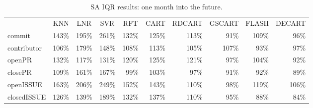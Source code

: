 \documentclass[smallextended]{svjour3}
\begin{document}
\begin{table}[!t]
\centering
\caption{
SA  IQR  results: one month into the future.}
\label{tbl:iqr_sa}
\begin{adjustbox}{max width=0.96\textwidth}          
\begin{tabular}{lrrrrrrrrr}
            & \multicolumn{1}{c}{KNN}       & \multicolumn{1}{c}{LNR}       & \multicolumn{1}{c}{SVR}       & \multicolumn{1}{c}{RFT}       & \multicolumn{1}{c}{CART}      & \multicolumn{1}{c}{RDCART}    & \multicolumn{1}{c}{GSCART}    & \multicolumn{1}{c}{FLASH}     & \multicolumn{1}{c}{DECART}    \\
commit      & \cellcolor[HTML]{F2F2F2}143\% & \cellcolor[HTML]{F8F8F8}195\% & \cellcolor[HTML]{FFFFFF}261\% & \cellcolor[HTML]{F1F1F1}132\% & \cellcolor[HTML]{F1F1F1}125\% & \cellcolor[HTML]{EFEFEF}113\% & \cellcolor[HTML]{969696}91\%  & \cellcolor[HTML]{EFEFEF}109\% & \cellcolor[HTML]{B8B8B8}96\%  \\
contributor & \cellcolor[HTML]{EFEFEF}106\% & \cellcolor[HTML]{F6F6F6}179\% & \cellcolor[HTML]{F3F3F3}148\% & \cellcolor[HTML]{EFEFEF}108\% & \cellcolor[HTML]{EFEFEF}113\% & \cellcolor[HTML]{EFEFEF}105\% & \cellcolor[HTML]{EFEFEF}107\% & \cellcolor[HTML]{A3A3A3}93\%  & \cellcolor[HTML]{BFBFBF}97\%  \\
openPR      & \cellcolor[HTML]{F1F1F1}132\% & \cellcolor[HTML]{F0F0F0}117\% & \cellcolor[HTML]{F1F1F1}131\% & \cellcolor[HTML]{F0F0F0}120\% & \cellcolor[HTML]{F1F1F1}125\% & \cellcolor[HTML]{F0F0F0}121\% & \cellcolor[HTML]{BFBFBF}97\%  & \cellcolor[HTML]{EFEFEF}104\% & \cellcolor[HTML]{9D9D9D}92\%  \\
closePR     & \cellcolor[HTML]{EFEFEF}109\% & \cellcolor[HTML]{F4F4F4}161\% & \cellcolor[HTML]{F5F5F5}167\% & \cellcolor[HTML]{CDCDCD}99\%  & \cellcolor[HTML]{E8E8E8}103\% & \cellcolor[HTML]{BFBFBF}97\%  & \cellcolor[HTML]{969696}91\%  & \cellcolor[HTML]{9D9D9D}92\%  & \cellcolor[HTML]{888888}89\%  \\
openISSUE   & \cellcolor[HTML]{F5F5F5}163\% & \cellcolor[HTML]{F9F9F9}206\% & \cellcolor[HTML]{FDFDFD}249\% & \cellcolor[HTML]{F3F3F3}152\% & \cellcolor[HTML]{F2F2F2}143\% & \cellcolor[HTML]{EFEFEF}110\% & \cellcolor[HTML]{C6C6C6}98\%  & \cellcolor[HTML]{F0F0F0}119\% & \cellcolor[HTML]{EFEFEF}106\% \\
closedISSUE & \cellcolor[HTML]{F1F1F1}126\% & \cellcolor[HTML]{F2F2F2}139\% & \cellcolor[HTML]{F7F7F7}189\% & \cellcolor[HTML]{F1F1F1}132\% & \cellcolor[HTML]{F2F2F2}137\% & \cellcolor[HTML]{EFEFEF}110\% & \cellcolor[HTML]{B1B1B1}95\%  & \cellcolor[HTML]{818181}88\%  & \cellcolor[HTML]{666666}84\% 
\end{tabular}
\end{adjustbox}
\end{table}
\end{document}
